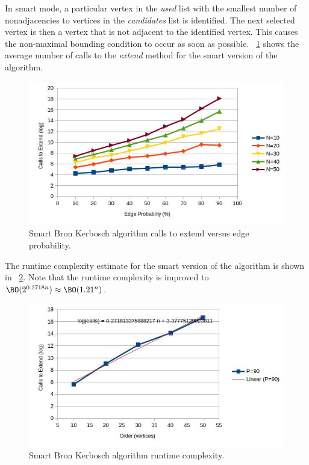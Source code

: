 In smart mode, a particular vertex in the \emph{used} list with the smallest number of nonadjacencies to vertices
in the \emph{candidates} list is identified.  The next selected vertex is then a vertex that is not adjacent to the
identified vertex.  This causes the non-maximal bounding condition to occur as soon as possible.
\figurename~\ref{fig:bron2:calls} shows the average number of calls to the \emph{extend} method for the smart
version of the algorithm.

\begin{figure}[H]
  \centering
  \includegraphics[width=5in]{bron1_calls}
  \caption{Smart Bron Kerbosch algorithm calls to extend versus edge probability.}
  \label{fig:bron2:calls}
\end{figure}

The runtime complexity estimate for the smart version of the algorithm is shown in
\figurename~\ref{fig:bron2:runtime}.  Note that the runtime complexity is improved to
\(\BO(2^{0.2718n})\approx\BO(1.21^n)\).

\begin{figure}[H]
  \centering
  \includegraphics[width=5in]{bron2_runtime}
  \caption{Smart Bron Kerbosch algorithm runtime complexity.}
  \label{fig:bron2:runtime}
\end{figure}

